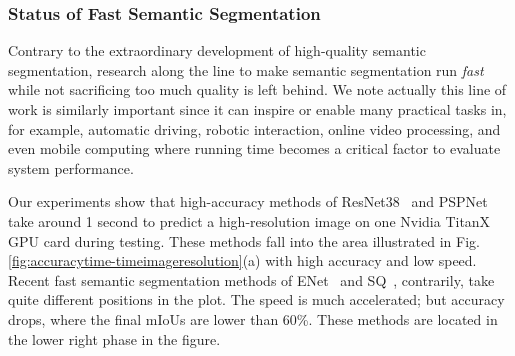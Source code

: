 \documentclass[runningheads]{llncs}
\begin{document}
\subsubsection{Status of Fast Semantic Segmentation}
Contrary to the extraordinary development of high-quality semantic segmentation, research along the line to make semantic segmentation run {\it fast} while not sacrificing too much quality is left behind. We note actually this line of work is similarly important since it can inspire or enable many practical tasks in, for example, automatic driving, robotic interaction, online video processing, and even mobile computing where running time becomes a critical factor to evaluate system performance.

Our experiments show that high-accuracy methods of ResNet38~\cite{wu2016wider} and PSPNet~\cite{zhao2017pspnet} take around 1 second to predict a  high-resolution image on one Nvidia TitanX GPU card during testing. These methods fall into the area illustrated in Fig. \ref{fig:accuracytime-timeimageresolution}(a) with high accuracy and low speed. Recent fast semantic segmentation methods of ENet~\cite{paszke2016enet} and SQ~\cite{treml2016speeding}, contrarily, take quite different positions in the plot. The speed is much accelerated; but accuracy drops, where the final mIoUs are lower than 60\%. These methods are located in the lower right phase in the figure.
\end{document}
